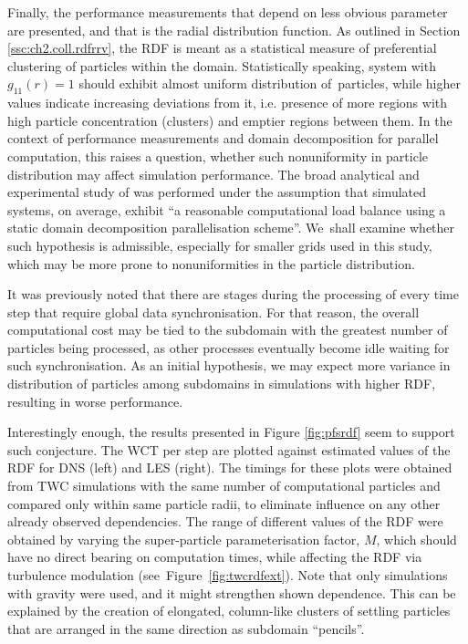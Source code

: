 \documentclass{pracamgren}
\begin{document}
Finally, the performance measurements that depend on less obvious parameter are presented, and that is the radial distribution function.
As outlined in Section \ref{ssc:ch2.coll.rdfrrv}, the RDF is meant as a statistical measure of preferential clustering of particles within the domain.
Statistically speaking, system with $g_{11}(r) = 1$ should exhibit almost uniform distribution of~particles, while higher values indicate increasing deviations from it, i.e. presence of more regions with high particle concentration (clusters) and emptier regions between them.
In the context of performance measurements and domain decomposition for parallel computation, this raises a question, whether such nonuniformity in particle distribution may affect simulation performance.
The broad analytical and experimental study of \textcite{Ayala2014} was performed under the assumption that simulated systems, on average, exhibit ``a reasonable computational load balance using a static domain decomposition parallelisation scheme''.
We~shall examine whether such hypothesis is admissible, especially for smaller grids used in this study, which may be more prone to nonuniformities in the particle distribution.

It was previously noted that there are stages during the processing of every time step that require global data synchronisation.
For that reason, the overall computational cost may be tied to the subdomain with the greatest number of particles being processed, as other processes eventually become idle waiting for such synchronisation.
As an initial hypothesis, we may expect more variance in distribution of particles among subdomains in simulations with higher RDF, resulting in worse performance.

Interestingly enough, the results presented in Figure \ref{fig:pfsrdf} seem to support such conjecture.
The WCT per step are plotted against estimated values of the RDF for DNS (left) and LES (right).
The timings for these plots were obtained from TWC simulations with the same number of computational particles and compared only within same particle radii, to eliminate influence on any other already observed dependencies.
The range of different values of the RDF were obtained by varying the super-particle parameterisation factor, $M$, which should have no direct bearing on computation times, while affecting the RDF via turbulence modulation (see~Figure~\ref{fig:twcrdfext}). 
Note that only simulations with gravity were used, and it might strengthen shown dependence.
This can be explained by the creation of elongated, column-like clusters of settling particles that are arranged in the same direction as subdomain ``pencils''.
\end{document}

